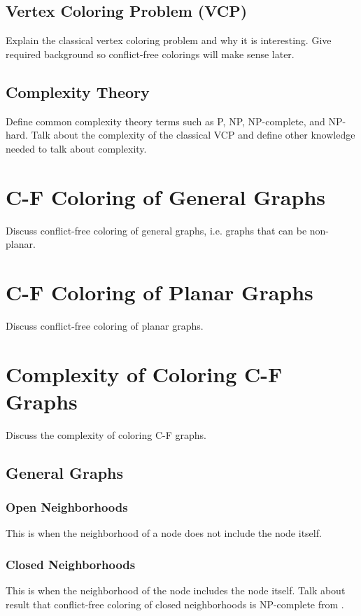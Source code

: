 \documentclass{sig-alternate}
\begin{document}
\subsection{Vertex Coloring Problem (VCP)}
\label{sec:vcp}
Explain the classical vertex coloring problem and why it is interesting. Give required background so conflict-free colorings will make sense later.

\subsection{Complexity Theory}
\label{sec:complexitytheory}
Define common complexity theory terms such as P, NP, NP-complete, and NP-hard. Talk about the complexity of the classical VCP and define other knowledge needed to talk about complexity.

\section{C-F Coloring of General Graphs}
Discuss conflict-free coloring of general graphs, i.e. graphs that can be non-planar.
\section{C-F Coloring of Planar Graphs}
Discuss conflict-free coloring of planar graphs.

\section{Complexity of Coloring C-F Graphs}
Discuss the complexity of coloring C-F graphs.

\subsection{General Graphs}
\subsubsection{Open Neighborhoods}
This is when the neighborhood of a node does not include the node itself.

\subsubsection{Closed Neighborhoods}
This is when the neighborhood of the node includes the node itself. Talk about result that conflict-free coloring of closed neighborhoods is NP-complete from \cite{gargano2015complexity}.
\end{document}

